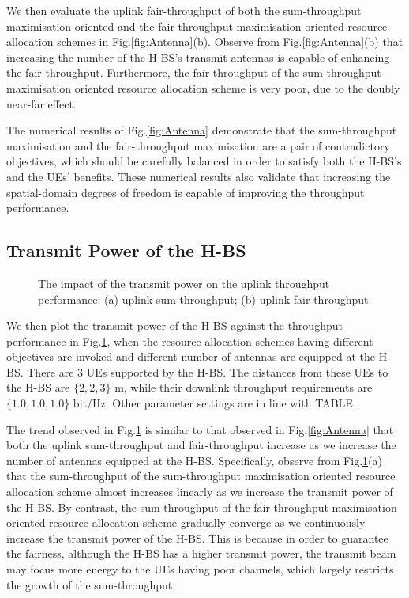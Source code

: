 \documentclass[12pt,draftcls,onecolumn,journal]{IEEEtran}
\begin{document}
We then evaluate the uplink fair-throughput of both the sum-throughput maximisation oriented and the fair-throughput maximisation oriented resource allocation schemes in Fig.\ref{fig:Antenna}(b). Observe from Fig.\ref{fig:Antenna}(b) that increasing the number of the H-BS's transmit antennas is capable of enhancing the fair-throughput. Furthermore, the fair-throughput of the sum-throughput maximisation oriented resource allocation scheme is very poor, due to the doubly near-far effect.

The numerical results of Fig.\ref{fig:Antenna} demonstrate that the sum-throughput maximisation and the fair-throughput maximisation are a pair of contradictory objectives, which should be carefully balanced in order to satisfy both the H-BS's and the UEs' benefits. These numerical results also validate that increasing the spatial-domain degrees of freedom is capable of improving the throughput performance.

\subsection{Transmit Power of the H-BS}

\begin{figure}[!t]
\setlength{\abovecaptionskip}{0pt}
\setlength{\belowcaptionskip}{0pt}\caption{The impact of the transmit power on the uplink throughput performance: (a) uplink sum-throughput; (b) uplink fair-throughput.}
\label{fig:TxPower}
\end{figure}

We then plot the transmit power of the H-BS against the throughput performance in Fig.\ref{fig:TxPower}, when the resource allocation schemes having different objectives are invoked and different number of antennas are equipped at the H-BS. There are $3$ UEs supported by the H-BS. The distances from these UEs to the H-BS are $\{2,2,3\}$ m, while their downlink throughput requirements are $\{1.0,1.0,1.0\}$ bit/Hz. Other parameter settings are in line with TABLE \uppercase\expandafter{}.

The trend observed in Fig.\ref{fig:TxPower} is similar to that observed in Fig.\ref{fig:Antenna} that both the uplink sum-throughput and fair-throughput increase as we increase the number of antennas equipped at the H-BS. Specifically, observe from Fig.\ref{fig:TxPower}(a) that the sum-throughput of the sum-throughput maximisation oriented resource allocation scheme almost increases linearly as we increase the transmit power of the H-BS. By contrast, the sum-throughput of the fair-throughput maximisation oriented resource allocation scheme gradually converge as we continuously increase the transmit power of the H-BS. This is because in order to guarantee the fairness, although the H-BS has a higher transmit power, the transmit beam may focus more energy to the UEs having poor channels, which largely restricts the growth of the sum-throughput.
\end{document}
